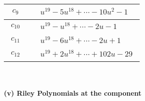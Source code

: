 \documentclass[1p]{elsarticle_modified}
\theoremstyle{definition}
\begin{document}
\begin{tabular}{m{50pt}|m{274pt}}
\hline $$\begin{aligned}c_{9}\end{aligned}$$&$\begin{aligned}
&u^{19}-5 u^{18}+\cdots-10 u^2-1
\end{aligned}$\\
\hline $$\begin{aligned}c_{10}\end{aligned}$$&$\begin{aligned}
&u^{19}- u^{18}+\cdots-2 u-1
\end{aligned}$\\
\hline $$\begin{aligned}c_{11}\end{aligned}$$&$\begin{aligned}
&u^{19}-6 u^{18}+\cdots-2 u+1
\end{aligned}$\\
\hline $$\begin{aligned}c_{12}\end{aligned}$$&$\begin{aligned}
&u^{19}+2 u^{18}+\cdots+102 u-29
\end{aligned}$\\
\hline
\end{tabular}\\~\\
\newpage\renewcommand{\arraystretch}{1}
\flushleft \textbf{(v) Riley Polynomials at the component}\newline \\
\end{document}
